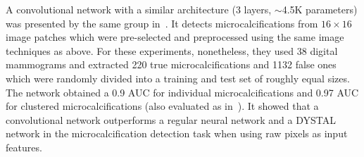 \begin{comment} Lo 1998
- similar to Lo 1995:
	detect microcalcifications
	pre-selected image patches
	8 rotations per image(0,90,180,270 and flipped)
	sigmoid activation function
	16 by 16 pixel size
	5 by 5 filters
	2 outputs
	clustering method
- only 10 groups per layer
- "Typically, the sizes of microcalcifications vary from 0.16 mm to 1.0 mm."
- each pixel 0.1mm, more than that may make dissapear the microcalc.
- DYSTAL network, regular neural network, and convolutional network. convnet ouptperforms them.
- rotation and translation invariance.
- gaussian-like activation function in input (?)
- 38 "digital" mammograms: 220 true and 1132 subtle microcalcififcations
- divided into two roughly equal sets for test (no cross validation)
- 0.9 AUC for microcalc and 0.97 AUC for clustered microcalcif
\end{comment}
A convolutional network with a similar architecture (3 layers, $\sim$4.5K parameters) was presented by the same group in~\cite{Lo1998}. It detects microcalcifications from $16 \times 16$ image patches which were pre-selected and preprocessed using the same image techniques as above. For these experiments, nonetheless, they used 38 digital mammograms and extracted 220 true microcalcifications and 1132 false ones which were randomly divided into a training and test set of roughly equal sizes. The network obtained a 0.9 AUC for individual microcalcifications and 0.97 AUC for clustered microcalcifications (also evaluated as in~\cite{Lo1995}). It showed that a convolutional network outperforms a regular neural network and a DYSTAL network in the microcalcification detection task when using raw pixels as input features.



